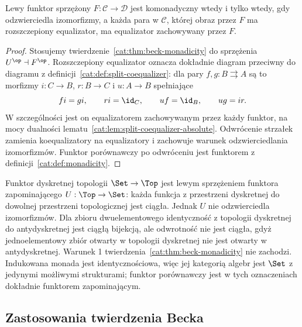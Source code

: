\begin{wniosek}\label{cat:cor:beck-comonadicity}
Lewy funktor sprzężony $F:\mathcal C\to\mathcal D$ jest komonadyczny wtedy i tylko wtedy, gdy odzwierciedla izomorfizmy, a każda para w $\mathcal C$, której obraz przez $F$ ma rozszczepiony equalizator, ma equalizator zachowywany przez $F$.
\end{wniosek}
\begin{proof}
Stosujemy twierdzenie~\ref{cat:thm:beck-monadicity} do sprzężenia $U^{\op}\dashv F^{\op}$. Rozszczepiony equalizator oznacza dokładnie diagram przeciwny do diagramu z definicji~\ref{cat:def:split-coequalizer}: dla pary $f,g:B\rightrightarrows A$ są to morfizmy $i:C\to B$, $r:B\to C$ i $u:A\to B$ spełniające
\[
 fi=gi,\qquad ri=\id_C,\qquad uf=\id_B,\qquad ug=ir.
\]
W szczególności jest on equalizatorem zachowywanym przez każdy funktor, na mocy dualności lematu~\ref{cat:lem:split-coequalizer-absolute}. Odwrócenie strzałek zamienia koequalizatory na equalizatory i zachowuje warunek odzwierciedlania izomorfizmów. Funktor porównawczy po odwróceniu jest funktorem z definicji~\ref{cat:def:monadicity}.
\end{proof}

\begin{przyklad}\label{cat:ex:nonmonadic-top}
Funktor dyskretnej topologii $\Set\to\Top$ jest lewym sprzężeniem funktora zapominającego $U:\Top\to\Set$: każda funkcja z przestrzeni dyskretnej do dowolnej przestrzeni topologicznej jest ciągła. Jednak $U$ nie odzwierciedla izomorfizmów. Dla zbioru dwuelementowego identyczność z topologii dyskretnej do antydyskretnej jest ciągłą bijekcją, ale odwrotność nie jest ciągła, gdyż jednoelementowy zbiór otwarty w topologii dyskretnej nie jest otwarty w antydyskretnej. Warunek 1 twierdzenia~\ref{cat:thm:beck-monadicity} nie zachodzi. Indukowana monada jest identycznościowa, więc jej kategorią algebr jest $\Set$ z jedynymi możliwymi strukturami; funktor porównawczy jest w tych oznaczeniach dokładnie funktorem zapominającym.
\end{przyklad}


\subsection{Zastosowania twierdzenia Becka}


